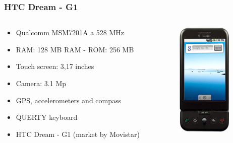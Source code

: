 \documentclass{beamer}
\begin{document}
\begin{frame}
\frametitle{HTC Dream - G1}

\begin{columns}
\begin{column}{0.63\textwidth}

\begin{itemize}
\item Qualcomm MSM7201A a 528 MHz
\item RAM: 128 MB RAM - ROM: 256 MB
\item Touch screen: 3,17 inches
\item Camera: 3.1 Mp
\item GPS, accelerometers and compass
\item QUERTY keyboard
\item HTC Dream - G1 (market by Movistar)
\end{itemize}
\end{column}

\begin{column}{0.4\textwidth}
\begin{center}
  \includegraphics[height=5.5cm]{figs/tmobile-g1}
\end{center}
\end{column}
\end{columns}
\end{frame}
\end{document}
